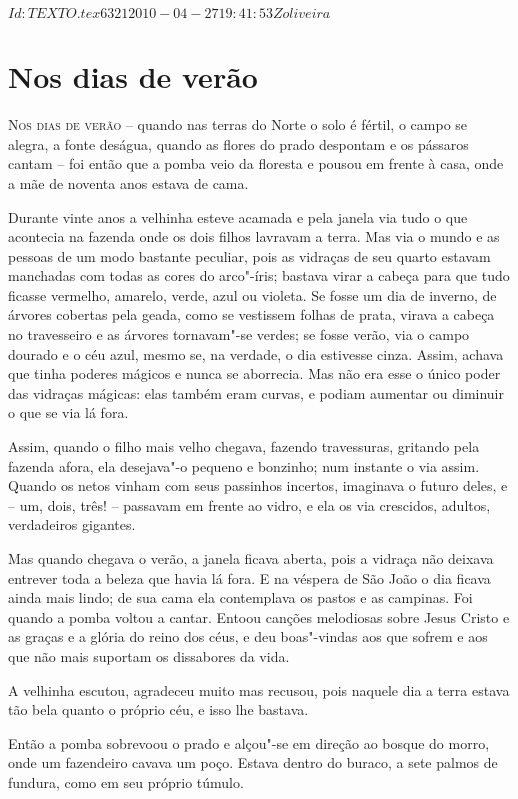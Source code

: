 \SVN $Id: TEXTO.tex 6321 2010-04-27 19:41:53Z oliveira $ 
\chapter{Nos dias de verão}


\textsc{Nos dias de verão} -- quando nas terras do Norte o solo é fértil, o campo
se alegra, a fonte deságua, quando as flores do prado despontam e os
pássaros cantam -- foi então que a pomba veio da floresta e pousou em
frente à casa, onde a mãe de noventa anos estava de cama.

Durante vinte anos a velhinha esteve acamada e pela janela via tudo o
que acontecia na fazenda onde os dois filhos lavravam a terra. Mas via
o mundo e as pessoas de um modo bastante peculiar, pois as vidraças de
seu quarto estavam manchadas com todas as cores do arco"-íris; bastava
virar a cabeça para que tudo ficasse vermelho, amarelo, verde, azul ou
violeta. Se fosse um dia de inverno, de árvores cobertas pela geada,
como se vestissem folhas de prata, virava a cabeça no travesseiro e as
árvores tornavam"-se verdes; se fosse verão, via o campo dourado e o
céu azul, mesmo se, na verdade, o dia estivesse cinza. Assim, achava
que tinha poderes mágicos e nunca se aborrecia. Mas não era esse o
único poder das vidraças mágicas: elas também eram curvas, e podiam
aumentar ou diminuir o que se via lá fora.

Assim, quando o filho mais velho chegava, fazendo travessuras, gritando
pela fazenda afora, ela desejava"-o pequeno e bonzinho; num instante o
via assim. Quando os netos vinham com seus passinhos incertos,
imaginava o futuro deles, e -- um, dois, três! -- passavam em frente ao
vidro, e ela os via crescidos, adultos, verdadeiros gigantes.

Mas quando chegava o verão, a janela ficava aberta, pois a vidraça não
deixava entrever toda a beleza que havia lá fora. 
E na véspera de São João o dia ficava ainda mais lindo;
de sua cama ela contemplava os pastos e as campinas. Foi quando a pomba
voltou a cantar. Entoou canções melodiosas sobre Jesus Cristo e as
graças e a glória do reino dos céus, e deu boas"-vindas aos que sofrem
e aos que não mais suportam os dissabores da vida. 

A velhinha escutou, agradeceu muito mas recusou, pois naquele dia a
terra estava tão bela quanto o próprio céu, e isso lhe bastava.

Então a pomba sobrevoou o prado e alçou"-se em direção ao bosque do
morro, onde um fazendeiro cavava um poço. Estava dentro do buraco, a
sete palmos de fundura, como em seu próprio túmulo.

